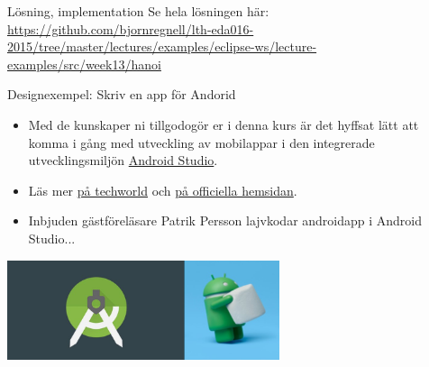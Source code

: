 \documentclass{lecturenotes}
\begin{document}
\begin{Slide}{Lösning, implementation}
Se hela lösningen här:
\url{https://github.com/bjornregnell/lth-eda016-2015/tree/master/lectures/examples/eclipse-ws/lecture-examples/src/week13/hanoi}
\end{Slide} 
\begin{Slide}{Designexempel: Skriv en app för Andorid}
\begin{itemize}
\item Med de kunskaper ni tillgodogör er i denna kurs är det hyffsat lätt att komma i gång med utveckling av mobilappar i den integrerade utvecklingsmiljön \href{https://en.wikipedia.org/wiki/Android_Studio}{Android Studio}.
\item Läs mer \href{http://techworld.idg.se/2.2524/1.602344/premiar-for-android-studio}{på techworld} och \href{http://developer.android.com/develop/index.html}{på officiella hemsidan}.
\item Inbjuden gästföreläsare Patrik Persson lajvkodar androidapp i Android Studio...
\end{itemize}
\begin{center}
\includegraphics[width=0.6\textwidth]{img/android-studio}
\end{center}
\end{Slide}
\end{document}

